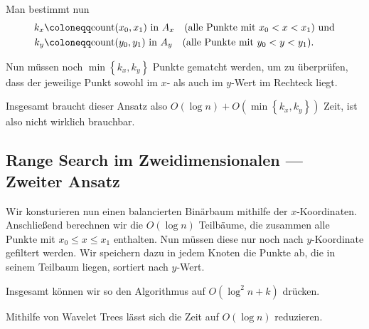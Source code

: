 Man bestimmt nun
\begin{align*}
  k_x &\coloneqq \text{count}(x_0,x_1) \text{ in } A_x \quad \text{(alle Punkte mit \( x_0 < x < x_1 \))} \text{ und} \\
  k_y &\coloneqq \text{count}(y_0, y_1) \text{ in } A_y \quad \text{(alle Punkte mit \( y_0 < y < y_1 \))} \text{.}
\end{align*}

Nun müssen noch \( \min\left \{ k_x,k_y \right \} \) Punkte gematcht werden, um zu überprüfen, dass der jeweilige Punkt sowohl im \( x \)- als auch im \( y \)-Wert im Rechteck liegt.

Insgesamt braucht dieser Ansatz also \( O(\log n) + O(\min\left \{ k_x,k_y \right \}) \) Zeit, ist also nicht wirklich brauchbar.

\subsection{Range Search im Zweidimensionalen --- Zweiter Ansatz}

Wir konsturieren nun einen balancierten Binärbaum mithilfe der \( x \)-Koordinaten. Anschließend berechnen wir die \( O(\log n) \) Teilbäume, die zusammen alle Punkte mit \( x_0 \leq x \leq x_1 \) enthalten. Nun müssen diese nur noch nach \( y \)-Koordinate gefiltert werden. Wir speichern dazu in jedem Knoten die Punkte ab, die in seinem Teilbaum liegen, sortiert nach \( y \)-Wert.

Insgesamt können wir so den Algorithmus auf \( O(\log^2 n + k) \) drücken.

Mithilfe von Wavelet Trees lässt sich die Zeit auf \( O(\log n) \) reduzieren.